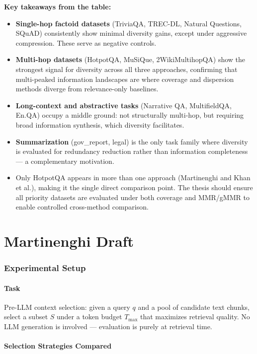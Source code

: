 \documentclass[11pt,a4paper]{article}
\begin{document}
\noindent\textbf{Key takeaways from the table:}
\begin{itemize}[leftmargin=*]
	\item \textbf{Single-hop factoid datasets} (TriviaQA, TREC-DL, Natural Questions, SQuAD) consistently show minimal diversity gains, except under aggressive compression. These serve as negative controls.
	\item \textbf{Multi-hop datasets} (HotpotQA, MuSiQue, 2WikiMultihopQA) show the strongest signal for diversity across all three approaches, confirming that multi-peaked information landscapes are where coverage and dispersion methods diverge from relevance-only baselines.
	\item \textbf{Long-context and abstractive tasks} (Narrative QA, MultifieldQA, En.QA) occupy a middle ground: not structurally multi-hop, but requiring broad information synthesis, which diversity facilitates.
	\item \textbf{Summarization} (gov\_report, legal) is the only task family where diversity is evaluated for redundancy reduction rather than information completeness --- a complementary motivation.
	\item Only HotpotQA appears in more than one approach (Martinenghi and Khan et al.), making it the single direct comparison point. The thesis should ensure all priority datasets are evaluated under both coverage and MMR/gMMR to enable controlled cross-method comparison.
\end{itemize}

\part{Martinenghi Draft}

\section{Experimental Setup}

\subsection{Task}
Pre-LLM context selection: given a query $q$ and a pool of candidate text chunks, select a subset $S$ under a token budget $T_{\max}$ that maximizes retrieval quality.
No LLM generation is involved --- evaluation is purely at retrieval time.

\subsection{Selection Strategies Compared}
\end{document}
